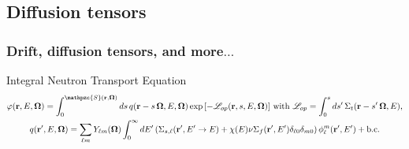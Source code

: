 \documentclass[black]{slideCEA}
\newcommand{\bOm}{\boldsymbol{\Omega}}
\begin{document}
% 

% 

\subsection{Diffusion tensors}
\begin{frame}
  \frametitle{Drift, diffusion tensors, and more$\ldots$}
  \begin{block}{Integral Neutron Transport Equation}
   \begin{gather*}
   \varphi({\mathbf{r}, E, \bOm}) =
     \int_0^{\mathpzc{S}(\mathbf{r},\bOm)}{ds\,
     q(\mathbf{r} - s\, \bOm, E, \bOm) \exp{ \left[
     - \mathscr{L}_{op}(\mathbf{r}, s, E, \bOm) \right]}
   }\text{ with } \mathscr{L}_{op} = \int_0^{s}{ds'\, \Sigma_t(\mathbf{r} - s'\, \bOm, E)},\\
     q(\mathbf{r}', E, \bOm) = \sum_{\ell m} {Y_{\ell m}(\bOm)
       \int_0^{\infty}{dE' \left( \Sigma_{s,\ell}(\mathbf{r}', E' \rightarrow E)
       + \chi(E) \nu\Sigma_f(\mathbf{r}', E')\delta_{\ell 0}\delta_{m 0} \right)
       \phi_\ell^m(\mathbf{r}', E')}} + \text{b.c.}
   \end{gather*}


\end{block}
\end{frame}
\end{document}
